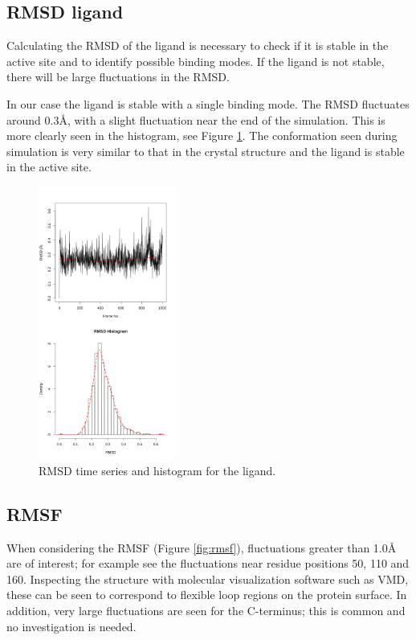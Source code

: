 \documentclass[twocolumn]{bmcart}%
\begin{document}
\subsection*{RMSD ligand}
Calculating the RMSD of the ligand is necessary to check if it is stable in the active site and to identify possible binding modes. If the ligand is not stable, there will be large fluctuations in the RMSD.

In our case the ligand is stable with a single binding mode. The RMSD fluctuates around 0.3{\AA}, with a slight fluctuation near the end of the simulation. This is more clearly seen in the histogram, see Figure \ref{fig:rmsdligand}. The conformation seen during simulation is very similar to that in the crystal structure and the ligand is stable in the active site.

\begin{figure}[ht!]
  \includegraphics[width=0.4\textwidth]{htmd_analysis_rmsd2_merge}
  \caption{
      RMSD time series and histogram for the ligand.}
  \label{fig:rmsdligand}
\end{figure}


\subsection*{RMSF}
When considering the RMSF (Figure \ref{fig:rmsf}), fluctuations greater than 1.0{\AA} are of interest; for example see the fluctuations near residue positions 50, 110 and 160.  Inspecting the structure with molecular visualization software such as VMD, these can be seen to correspond to flexible loop regions on the protein surface. In addition, very large fluctuations are seen for the C-terminus; this is common and no investigation is needed.
\end{document}
